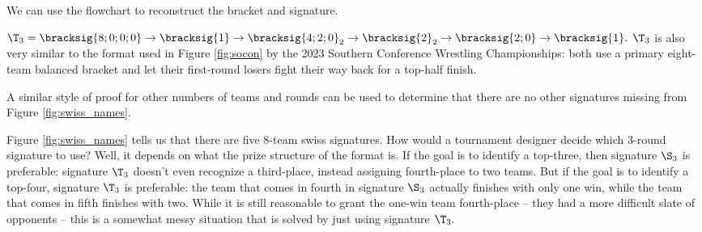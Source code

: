 {    We can use the flowchart to reconstruct the bracket and signature.


    $\T_3 = \bracksig{8;0;0;0} \to \bracksig{1} \to \bracksig{4;2;0}_2 \to \bracksig{2}_2 \to \bracksig{2;0} \to \bracksig{1}.$ $\T_3$ is also very similar to the format used in Figure \ref{fig:socon} by the 2023 Southern Conference Wrestling Championships: both use a primary eight-team balanced bracket and let their first-round losers fight their way back for a top-half finish.


A similar style of proof for other numbers of teams and rounds can be used to determine that there are no other signatures missing from Figure \ref{fig:swiss_names}.

Figure \ref{fig:swiss_names} tells us that there are five $8$-team swiss signatures. How would a tournament designer decide which 3-round signature to use? Well, it depends on what the prize structure of the format is. If the goal is to identify a top-three, then signature $\S_3$ is preferable: signature $\T_3$ doesn't even recognize a third-place, instead assigning fourth-place to two teams. But if the goal is to identify a top-four, signature $\T_3$ is preferable: the team that comes in fourth in signature $\S_3$ actually finishes with only one win, while the team that comes in fifth finishes with two. While it is still reasonable to grant the one-win team fourth-place -- they had a more difficult slate of opponents -- this is a somewhat messy situation that is solved by just using signature $\T_3.$

}
